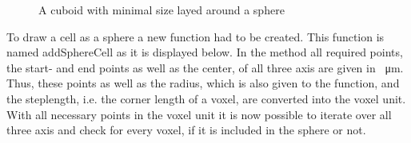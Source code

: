 \begin{figure}
\begin{center}
\caption{A cuboid with minimal size layed around a sphere}
\label{tikz:CuboidSphere}
\end{center}
\end{figure}

To draw a cell as a sphere a new function had to be created. This function is named addSphereCell as it is displayed below. In the method all required points, the start- and end points as well as the center, of all three axis are given in \SI{}{\micro\metre}. Thus, these points as well as the radius, which is also given to the function, and the steplength, i.e. the corner length of a voxel, are converted into the voxel unit. \newline
With all necessary points in the voxel unit it is now possible to iterate over all three axis and check for every voxel, if it is included in the sphere or not.



